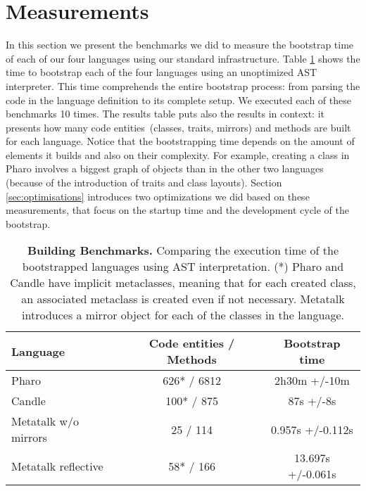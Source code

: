 \section{Measurements}\label{sec:bootstrap_measurements}

In this section we present the benchmarks we did to measure the bootstrap time of each of our four languages using our standard infrastructure. Table \ref{tb:measurements} shows the time to bootstrap each of the four languages using an unoptimized AST interpreter. This time comprehends the entire bootstrap process: from parsing the code in the language definition to its complete setup. We executed each of these benchmarks 10 times. The results table puts also the results in context: it presents how many code entities~(classes, traits, mirrors) and methods are built for each language. Notice that the bootstrapping time depends on the amount of elements it builds and also on their complexity. For example, creating a class in Pharo involves a biggest graph of objects than in the other two languages (because of the introduction of traits and class layouts). Section \ref{sec:optimisations} introduces two optimizations we did based on these measurements, that focus on the startup time and the development cycle of the bootstrap. 

 \begin{table}[ht]
 \small
 	\centering
 	\begin{tabular}{lcc}
			\toprule
			\textbf{Language}
			& \xspace\textbf{Code entities / Methods}\xspace
			& \xspace\textbf{Bootstrap time}\\
		\toprule
		Pharo & 626* / 6812 & 2h30m +/-10m \\\midrule
		Candle & 100* / 875 & 87s +/-8s \\\midrule
		Metatalk w/o mirrors & 25 / 114 & 0.957s +/-0.112s \\\midrule
		Metatalk reflective & 58* / 166 & 13.697s +/-0.061s \\\bottomrule
 	\end{tabular}
		\vspace*{0.2cm}
 	\caption{\small\textbf{Building Benchmarks.} Comparing the execution time of the bootstrapped languages using AST interpretation. (*) Pharo and Candle have implicit metaclasses, meaning that for each created class, an associated metaclass is created even if not necessary. Metatalk introduces a mirror object for each of the classes in the language.\label{tb:measurements}}
 \end{table}

